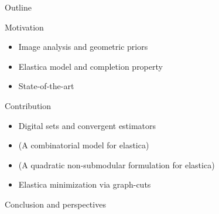 \begin{frame}
	{Outline}

\begin{enumerate}
	{
	\item{Motivation}
	\begin{itemize}
		\item{Image analysis and geometric priors}
		\item{Elastica model and completion property}		
		\item{State-of-the-art}							
	\end{itemize}}
	\vspace{1em}
	\item{Contribution}
	\begin{itemize}
		\item{Digital sets and convergent estimators}		
		\item{(A combinatorial model for elastica)}
		\item{(A quadratic non-submodular formulation for elastica)}	
		\item{Elastica minimization via graph-cuts}	
	\end{itemize}
	\vspace{1em}
	\item{Conclusion and perspectives}
\end{enumerate}
\end{frame}